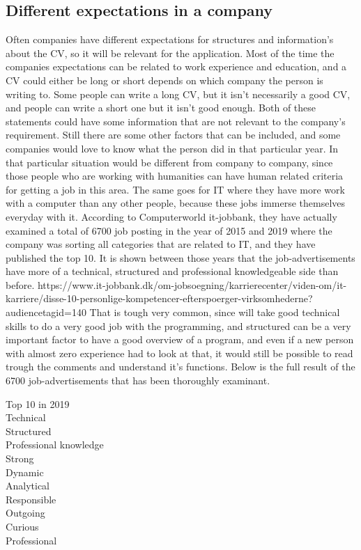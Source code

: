 \subsection{Different expectations in a company}
Often companies have different expectations for structures and information's about the CV, so it will be relevant for the application.
Most of the time the companies expectations can be related to work experience and education,
and a CV could either be long or short depends on which company the person is writing to. Some people can write a long CV,
but it isn't necessarily a good CV, and people can write a short one but it isn't good enough.
Both of these statements could have some information that are not relevant to the company's requirement. Still there are some other
factors that can be included, and some companies would love to know what the person did in that particular year.
In that particular situation would be different from company to company, since those people who are working with humanities
can have human related criteria for getting a job in this area. The same goes for IT where they have more work with a computer
than any other people, because these jobs immerse themselves everyday with it. According to Computerworld it-jobbank, 
they have actually examined a total of 6700 job posting in the year of 2015 and 2019 where the company was sorting all categories
that are related to IT, and they have published the top 10. It is shown between those years that the job-advertisements
have more of a technical, structured and professional knowledgeable side than before.
https://www.it-jobbank.dk/om-jobsoegning/karrierecenter/viden-om/it-karriere/disse-10-personlige-kompetencer-efterspoerger-virksomhederne?audiencetagid=140
That is tough very common, since will take good technical skills to do a very good job with the programming,
and structured can be a very important factor to have a good overview of a program,
and even if a new person with almost zero experience had to look at that,
it would still be possible to read trough the comments and understand it's functions. Below is the full result
of the 6700 job-advertisements that has been thoroughly examinant.

Top 10 in 2019 \\

Technical \\
Structured \\
Professional knowledge \\
Strong \\
Dynamic \\
Analytical \\
Responsible \\
Outgoing \\
Curious \\
Professional \\

